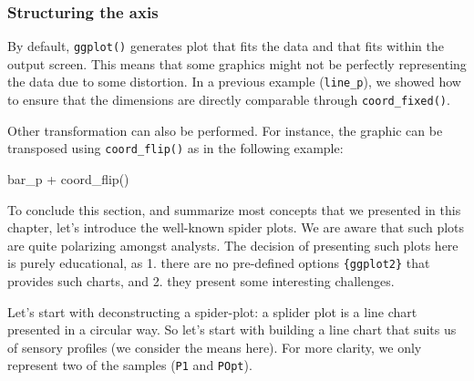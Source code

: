 \documentclass[
]{book}
\newenvironment{Shaded}{\begin{snugshade}}{\end{snugshade}}
\newcommand{\FunctionTok}[1]{\textcolor[rgb]{0.00,0.00,0.00}{#1}}
\newcommand{\NormalTok}[1]{#1}
\newcommand{\SpecialCharTok}[1]{\textcolor[rgb]{0.00,0.00,0.00}{#1}}
\begin{document}
\hypertarget{structuring-the-axis}{%
\subsubsection{Structuring the axis}\label{structuring-the-axis}}

By default, \texttt{ggplot()} generates plot that fits the data and that fits within the output screen. This means that some graphics might not be perfectly representing the data due to some distortion. In a previous example (\texttt{line\_p}), we showed how to ensure that the dimensions are directly comparable through \texttt{coord\_fixed()}.

Other transformation can also be performed. For instance, the graphic can be transposed using \texttt{coord\_flip()} as in the following example:

\begin{Shaded}
\begin{Highlighting}[]
\NormalTok{bar\_p }\SpecialCharTok{+} \FunctionTok{coord\_flip}\NormalTok{()}
\end{Highlighting}
\end{Shaded}

To conclude this section, and summarize most concepts that we presented in this chapter, let's introduce the well-known spider plots. We are aware that such plots are quite polarizing amongst analysts. The decision of presenting such plots here is purely educational, as 1. there are no pre-defined options \texttt{\{ggplot2\}} that provides such charts, and 2. they present some interesting challenges.

Let's start with deconstructing a spider-plot: a splider plot is a line chart presented in a circular way. So let's start with building a line chart that suits us of sensory profiles (we consider the means here). For more clarity, we only represent two of the samples (\texttt{P1} and \texttt{POpt}).
\end{document}
